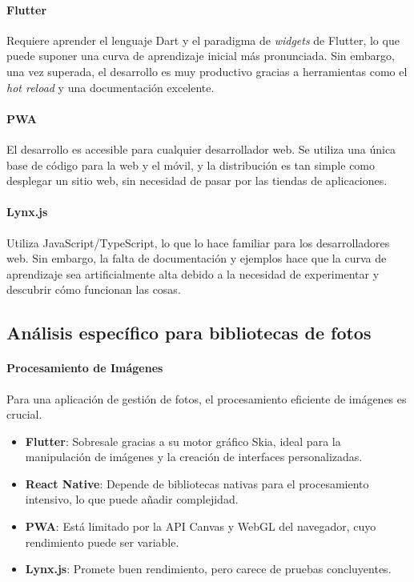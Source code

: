 \paragraph{Flutter}
Requiere aprender el lenguaje Dart y el paradigma de \textit{widgets} de Flutter, lo que puede suponer una curva de aprendizaje inicial más pronunciada. Sin embargo, una vez superada, el desarrollo es muy productivo gracias a herramientas como el \textit{hot reload} y una documentación excelente.

\paragraph{PWA}
El desarrollo es accesible para cualquier desarrollador web. Se utiliza una única base de código para la web y el móvil, y la distribución es tan simple como desplegar un sitio web, sin necesidad de pasar por las tiendas de aplicaciones.

\paragraph{Lynx.js}
Utiliza JavaScript/TypeScript, lo que lo hace familiar para los desarrolladores web. Sin embargo, la falta de documentación y ejemplos hace que la curva de aprendizaje sea artificialmente alta debido a la necesidad de experimentar y descubrir cómo funcionan las cosas.

\subsection{Análisis específico para bibliotecas de fotos}

\paragraph{Procesamiento de Imágenes}
Para una aplicación de gestión de fotos, el procesamiento eficiente de imágenes es crucial.
\begin{itemize}
    \item \textbf{Flutter}: Sobresale gracias a su motor gráfico Skia, ideal para la manipulación de imágenes y la creación de interfaces personalizadas.
    \item \textbf{React Native}: Depende de bibliotecas nativas para el procesamiento intensivo, lo que puede añadir complejidad.
    \item \textbf{PWA}: Está limitado por la API Canvas y WebGL del navegador, cuyo rendimiento puede ser variable.
    \item \textbf{Lynx.js}: Promete buen rendimiento, pero carece de pruebas concluyentes.
\end{itemize}

